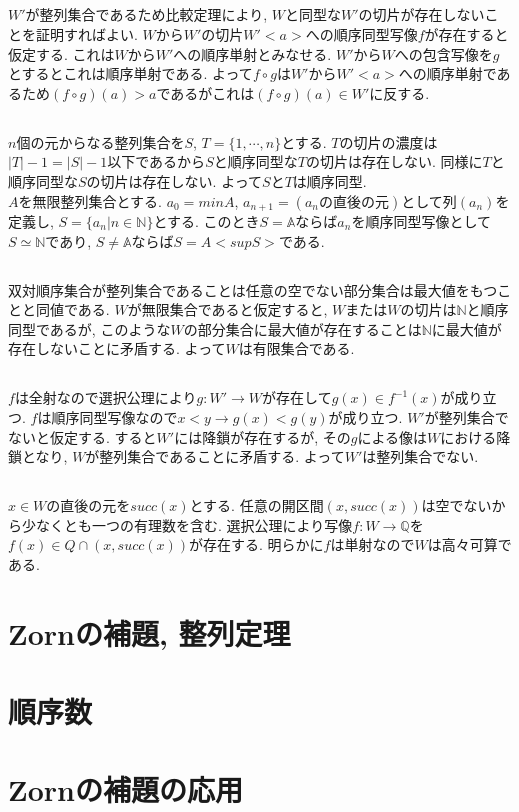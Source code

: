 \documentclass{jsarticle}
\begin{document}
\subsection{} %
$W'$が整列集合であるため比較定理により, $W$と同型な$W'$の切片が存在しないことを証明すればよい. $W$から$W'$の切片$W'<a>$への順序同型写像$f$が存在すると仮定する. これは$W$から$W'$への順序単射とみなせる. $W'$から$W$への包含写像を$g$とするとこれは順序単射である. よって$f \circ g$は$W'$から$W'<a>$への順序単射であるため$(f \circ g)(a) > a$であるがこれは$(f \circ g)(a) \in W'$に反する.

\subsection{} %
$n$個の元からなる整列集合を$S$, $T = \{1, \cdots, n\}$とする. $T$の切片の濃度は$|T| - 1 = |S| - 1$以下であるから$S$と順序同型な$T$の切片は存在しない. 同様に$T$と順序同型な$S$の切片は存在しない. よって$S$と$T$は順序同型.\\
$A$を無限整列集合とする. $a_0 = min A$, $a_{n + 1} = (a_nの直後の元)$として列$(a_n)$を定義し, $S = \{a_n | n \in \mathbb{N}\}$とする. このとき$S = \mathbb{A}$ならば$a_n$を順序同型写像として$S \simeq \mathbb{N}$であり, $S \neq \mathbb{A}$ならば$S = A<sup S>$である.

\subsection{} %
双対順序集合が整列集合であることは任意の空でない部分集合は最大値をもつことと同値である. $W$が無限集合であると仮定すると, $W$または$W$の切片は$\mathbb{N}$と順序同型であるが, このような$W$の部分集合に最大値が存在することは$\mathbb{N}$に最大値が存在しないことに矛盾する. よって$W$は有限集合である.

\subsection{} %
$f$は全射なので選択公理により$g:W' \rightarrow W$が存在して$g(x) \in f^{-1}(x)$が成り立つ. $f$は順序同型写像なので$x < y \rightarrow g(x) < g(y)$が成り立つ. $W'$が整列集合でないと仮定する. すると$W'$には降鎖が存在するが, その$g$による像は$W$における降鎖となり, $W$が整列集合であることに矛盾する. よって$W'$は整列集合でない.

\subsection{} %
$x \in W$の直後の元を$succ(x)$とする. 任意の開区間$(x, succ(x))$は空でないから少なくとも一つの有理数を含む. 選択公理により写像$f:W \rightarrow \mathbb{Q}$を$f(x) \in Q \cap (x, succ(x))$が存在する. 明らかに$f$は単射なので$W$は高々可算である.

\section{Zornの補題, 整列定理} %

\section{順序数} %
\section{Zornの補題の応用} %
\end{document}

